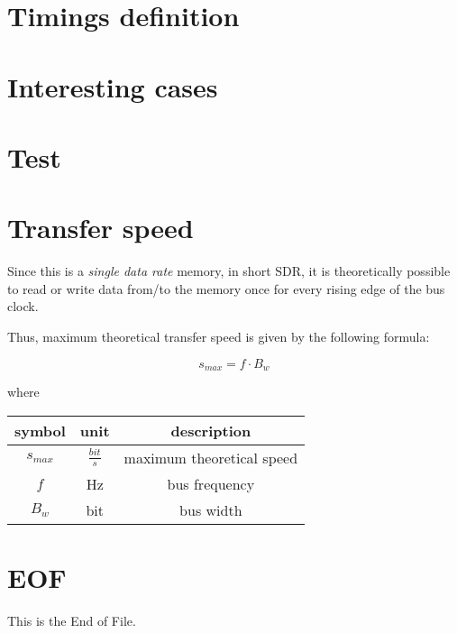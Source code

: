 \documentclass[a4paper,12pt]{article}
\begin{document}
\section{Timings definition}


\section{Interesting cases}

\section{Test}

\section{Transfer speed}
Since this is a \emph{single data rate} memory, in short SDR, it is theoretically possible to read or write data from/to the memory once for every rising edge of the bus clock.

Thus, maximum theoretical transfer speed is given by the following formula:

$$ s_{max} =  f \cdot B_w $$

where

\bgroup
\def\arraystretch{1.5}
\begin{table}[H]
\center
\begin{tabular}{| c | c | c |}\hline
\textbf{symbol} & \textbf{unit} & \textbf{description} \\ \hline
$ s_{max} $ & $ \frac{bit}{s} $ & maximum theoretical speed \\ \hline
$ f $ & Hz & bus frequency \\ \hline
$ B_{w} $ & bit & bus width \\ \hline
\end{tabular}
\end{table}
\egroup

\section{EOF}
This is the End of File.
\end{document}

